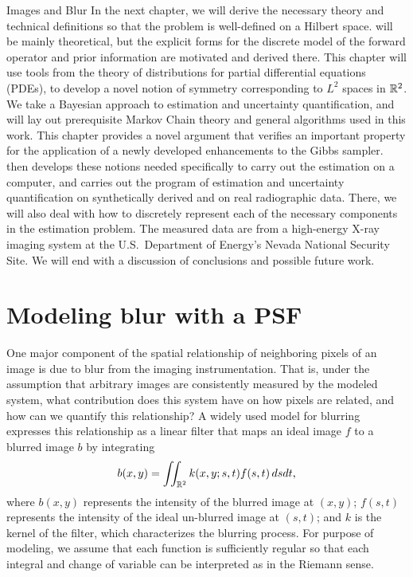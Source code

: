 \begin{chapter}{Images and Blur}
  In the next chapter, we will derive the necessary theory and technical definitions so that the problem is well-defined on a Hilbert space.
   will be mainly theoretical, but the explicit forms for the discrete model of the forward operator and prior information are motivated and derived there.
  This chapter will use tools from the theory of distributions for partial differential equations (PDEs), to develop a novel notion of symmetry corresponding to $L^2$ spaces in $\mathbb R^2$. 
  We take a Bayesian approach to estimation and uncertainty quantification, and  will lay out prerequisite Markov Chain theory and general algorithms used in this work.
  This chapter provides a novel argument that verifies an important property for the application of a newly developed enhancements to the Gibbs sampler.
   then develops these notions needed specifically to carry out the estimation on a computer, and carries out the program of estimation and uncertainty quantification on synthetically derived and on real radiographic data.
  There, we will also deal with how to discretely represent each of the necessary components in the estimation problem.
  The measured data are from a high-energy X-ray imaging system at the U.S.~Department of Energy's Nevada National Security Site.
  We will end with a discussion of conclusions and possible future work.

\section{Modeling blur with a PSF}
  
  One major component of the spatial relationship of neighboring pixels of an image is due to blur from the imaging instrumentation.
  That is, under the assumption that arbitrary images are consistently measured by the modeled system, what contribution does this system have on how pixels are related, and how can we quantify this relationship?
  A widely used model for blurring \citep{hansen2010,jain1989,vogel2002,epstein2008} expresses this relationship as a linear filter that maps an ideal image $f$ to a blurred image $b$ by integrating
\begin{equation}\label{eq:generalFilterForm}
  b(x,y) = \iint_{\mathbb R^2} k(x,y;s,t) f(s,t)\,dsdt,
\end{equation}
  where $b(x,y)$ represents the intensity of the blurred image at $(x,y)$; $f(s,t)$ represents the intensity of the ideal un-blurred image at $(s,t)$; and $k$ is the kernel of the filter, which characterizes the blurring process.
  For purpose of modeling, we assume that each function is sufficiently regular so that each integral and change of variable can be interpreted as in the Riemann sense.


\end{chapter}
